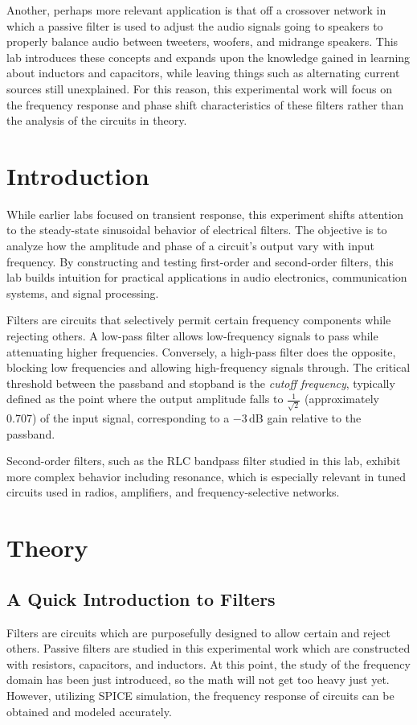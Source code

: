 \documentclass[12pt]{article}
\begin{document}
Another, perhaps more relevant application is that off a crossover
network in which a passive filter is used to adjust the audio signals going to
speakers to properly balance audio between tweeters, woofers, and midrange
speakers. This lab introduces these concepts and expands upon the knowledge
gained in learning about inductors and capacitors, while leaving things such as
alternating current sources still unexplained. For this reason, this
experimental work will focus on the frequency response and phase shift
characteristics of these filters rather than the analysis of the circuits in
theory.

\newpage
\section{Introduction}

While earlier labs focused on transient response, this experiment shifts attention to the steady-state sinusoidal behavior of electrical filters. The objective is to analyze how the amplitude and phase of a circuit’s output vary with input frequency. By constructing and testing first-order and second-order filters, this lab builds intuition for practical applications in audio electronics, communication systems, and signal processing.

Filters are circuits that selectively permit certain frequency components while rejecting others. A low-pass filter allows low-frequency signals to pass while attenuating higher frequencies. Conversely, a high-pass filter does the opposite, blocking low frequencies and allowing high-frequency signals through. The critical threshold between the passband and stopband is the \textit{cutoff frequency}, typically defined as the point where the output amplitude falls to $\frac{1}{\sqrt{2}}$ (approximately 0.707) of the input signal, corresponding to a $-3\,\mathrm{dB}$ gain relative to the passband.

Second-order filters, such as the RLC bandpass filter studied in this lab,
exhibit more complex behavior including resonance, which is especially relevant
in tuned circuits used in radios, amplifiers, and frequency-selective networks.


\section{Theory}
\subsection{A Quick Introduction to Filters}
Filters are circuits which are purposefully designed to allow certain and reject
others. Passive filters are studied in this experimental work which are
constructed with resistors, capacitors, and inductors. At this point, the study
of the frequency domain has been just introduced, so the math will not get too
heavy just yet. However, utilizing SPICE simulation, the frequency response of
circuits can be obtained and modeled accurately.
\end{document}
